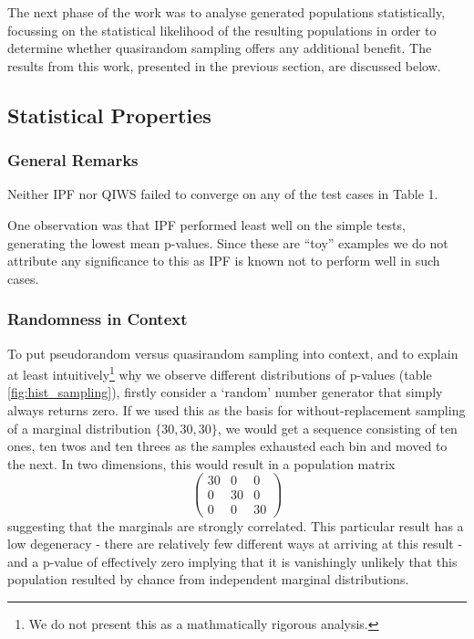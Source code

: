 \documentclass{JASSS}
\begin{document}
The next phase of the work was to analyse generated populations
statistically, focussing on the statistical likelihood of the resulting populations in order to determine whether quasirandom sampling offers any additional benefit.
The results from this work, presented in the previous section, are
discussed below.

\subsection{Statistical Properties}\label{statistical-properties-1}

\subsubsection{General Remarks}\label{general-remarks}

Neither IPF nor QIWS failed to converge on any of the test cases in
Table 1.

One observation was that IPF performed least well on the
simple tests, generating the lowest mean p-values. Since these are
``toy'' examples we do not attribute any significance to this as IPF is known not to perform well in such cases.

\subsubsection{Randomness in Context}\label{randomness-in-context}

To put pseudorandom versus quasirandom sampling into context, and to explain at least intuitively\footnote{We do not present this as a mathmatically rigorous analysis.} 
why we observe different distributions of p-values (table \ref{fig:hist_sampling}), firstly consider a
`random' number generator that simply always returns zero. If we used
this as the basis for without-replacement sampling of a marginal
distribution \(\lbrace30,30,30\rbrace\), we would get a sequence
consisting of ten ones, ten twos and ten threes as the samples exhausted
each bin and moved to the next. In two dimensions, this would result in
a population matrix
\[\left( \begin{array}{ccc}
30 & 0 & 0 \\
0 & 30 & 0 \\
0 & 0 & 30 \end{array} \right)\]
suggesting that the marginals are strongly correlated. This particular
result has a low degeneracy - there are relatively few different ways at
arriving at this result - and a p-value of effectively zero implying
that it is vanishingly unlikely that this population resulted by chance from independent marginal distributions.
\end{document}
